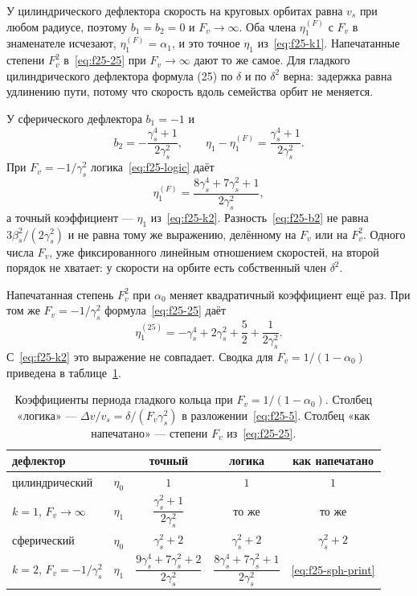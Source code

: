 У цилиндрического дефлектора скорость на круговых орбитах равна $v_s$ при любом радиусе, поэтому $b_1=b_2=0$ и $F_v\to\infty$. Оба члена $\eta_1^{(F)}$ с $F_v$ в знаменателе исчезают, $\eta_1^{(F)}=\alpha_1$, и это точное $\eta_1$ из~\eqref{eq:f25-k1}. Напечатанные степени $F_v^2$ в~\eqref{eq:f25-25} при $F_v\to\infty$ дают то же самое. Для гладкого цилиндрического дефлектора формула (25) по $\delta$ и по $\delta^2$ верна: задержка равна удлинению пути, потому что скорость вдоль семейства орбит не меняется.

У сферического дефлектора $b_1=-1$ и
\begin{equation}
\label{eq:f25-b2}
b_2=-\frac{\gamma_s^4+1}{2\gamma_s^2},
\qquad
\eta_1-\eta_1^{(F)}=\frac{\gamma_s^4+1}{2\gamma_s^2}.
\end{equation}
При $F_v=-1/\gamma_s^2$ логика~\eqref{eq:f25-logic} даёт
\begin{equation}
\label{eq:f25-sph-logic}
\eta_1^{(F)}=\frac{8\gamma_s^4+7\gamma_s^2+1}{2\gamma_s^2},
\end{equation}
а точный коэффициент --- $\eta_1$ из~\eqref{eq:f25-k2}. Разность~\eqref{eq:f25-b2} не равна $3\beta_s^2/(2\gamma_s^2)$ и не равна тому же выражению, делённому на $F_v$ или на $F_v^2$. Одного числа $F_v$, уже фиксированного линейным отношением скоростей, на второй порядок не хватает: у скорости на орбите есть собственный член $\delta^2$.

Напечатанная степень $F_v^2$ при $\alpha_0$ меняет квадратичный коэффициент ещё раз. При том же $F_v=-1/\gamma_s^2$ формула~\eqref{eq:f25-25} даёт
\begin{equation}
\label{eq:f25-sph-print}
\eta_1^{\mathrm{(25)}}
=
-\gamma_s^4+2\gamma_s^2+\frac{5}{2}+\frac{1}{2\gamma_s^2}.
\end{equation}
С~\eqref{eq:f25-k2} это выражение не совпадает. Сводка для $F_v=1/(1-\alpha_0)$ приведена в таблице~\ref{tab:f25}.

\begin{table}[htb]
\caption{Коэффициенты периода гладкого кольца при $F_v=1/(1-\alpha_0)$. Столбец «логика» --- $\Delta v/v_s=\delta/(F_v\gamma_s^2)$ в разложении~\eqref{eq:f25-5}. Столбец «как напечатано» --- степени $F_v$ из~\eqref{eq:f25-25}.}
\label{tab:f25}
\begin{ruledtabular}
\begin{tabular}{llccc}
дефлектор & & точный & логика & как напечатано \\
\hline
цилиндрический & $\eta_0$ & $1$ & $1$ & $1$ \\
$k=1$, $F_v\to\infty$ & $\eta_1$ & $\dfrac{\gamma_s^2+1}{2\gamma_s^2}$ & то же & то же \\
\hline
сферический & $\eta_0$ & $\gamma_s^2+2$ & $\gamma_s^2+2$ & $\gamma_s^2+2$ \\
$k=2$, $F_v=-1/\gamma_s^2$ & $\eta_1$ & $\dfrac{9\gamma_s^4+7\gamma_s^2+2}{2\gamma_s^2}$ & $\dfrac{8\gamma_s^4+7\gamma_s^2+1}{2\gamma_s^2}$ & \eqref{eq:f25-sph-print} \\
\end{tabular}
\end{ruledtabular}
\end{table}

